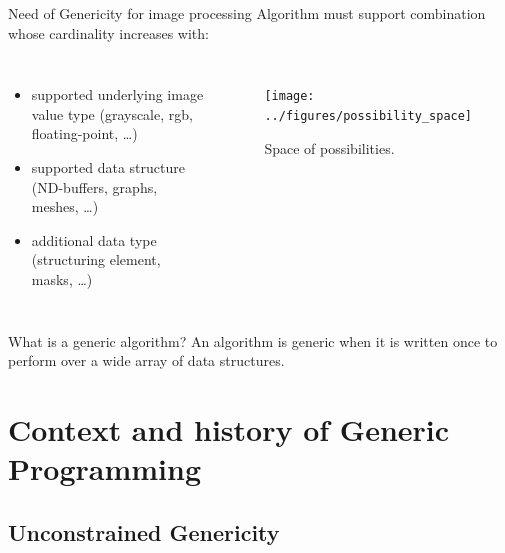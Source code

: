 \documentclass[12pt,aspectratio=169]{beamer}
\begin{document}
\begin{frame}[fragile]{Need of Genericity for image processing}
  Algorithm must support combination whose cardinality increases with:

  \begin{columns}[T,onlytextwidth]
    \begin{itemize}
      \item supported underlying image value type (grayscale, rgb, floating-point, \ldots)
      \item supported data structure (ND-buffers, graphs, meshes, \ldots)
      \item additional data type (structuring element, masks, \ldots)
    \end{itemize}

    \begin{figure}[htbp]
      \centering
      \texttt{[image: ../figures/possibility\_space]}
      \caption{Space of possibilities.}
      \label{fig:int.possibility_space}
    \end{figure}
  \end{columns}

  \begin{alertblock}{What is a generic algorithm?}
    An algorithm is generic when it is written once to perform over a wide array of data structures.
  \end{alertblock}
\end{frame}

%
%
%


\section[Context and history of Generic Programming]{Context and history of Generic Programming}

\subsection[Unconstrained Genericity]{Unconstrained Genericity}
\end{document}
